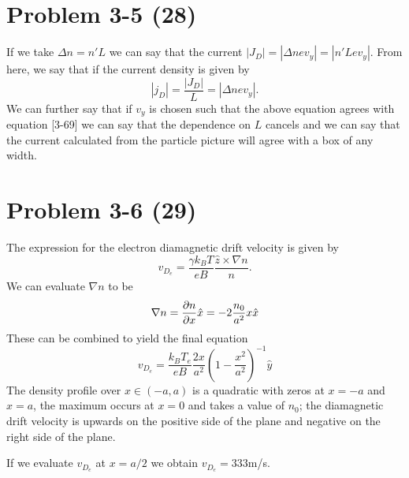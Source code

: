 \section*{Problem 3-5 (28)}
\label{sec:3-5}
If we take \(\Delta n = n'L \) we can say that the current \(|J_D| = |\Delta nev_y| = |n'Lev_y|\). From here, we say that if the current density is given by 
\begin{equation*}
	|j_D| = \dfrac{|J_D|}{L} = |\Delta nev_y|.
\end{equation*}
We can further say that if \(v_y \) is chosen such that the above equation agrees with equation [3-69] we can say that the dependence on \(L \) cancels and we can say that the current calculated from the particle picture will agree with a box of any width.

\section*{Problem 3-6 (29)}
\label{sec:3-6}
The expression for the electron diamagnetic drift velocity is given by
\begin{equation*}
	v_{D_e} = \dfrac{\gamma k_BT}{eB}\dfrac{\hat{z}\times\nabla n}{n}.
\end{equation*}
We can evaluate \(\nabla n \) to be
\begin{equation*}
	\nabla n = \frac{\partial n}{\partial x}\hat{x} = -2\dfrac{n_0}{a^2}x\hat{x}
\end{equation*}
These can be combined to yield the final equation
\begin{equation*}
	v_{D_e} = \dfrac{k_BT_e}{eB}\dfrac{2x}{a^2}\left(1 - \dfrac{x^2}{a^2}\right)^{-1}\hat{y}
\end{equation*}
The density profile over \(x \in (-a,a) \) is a quadratic with zeros at \(x=-a\) and \(x=a\), the maximum occurs at \(x=0\) and takes a value of \(n_0\); the diamagnetic drift velocity is upwards on the positive side of the plane and negative on the right side of the plane. 

If we evaluate \(v_{D_e}\) at \(x = a/2\) we obtain \(v_{D_e} = 333 \)m/s.

